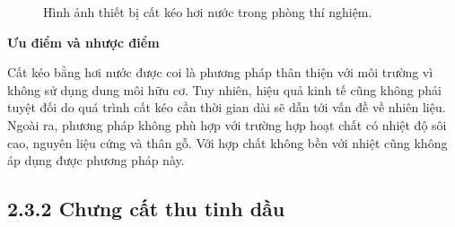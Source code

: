 \documentclass[
  twocolumn,
  landscape]{report}
\begin{document}
\begin{figure}


\caption{\label{fig-Catkeuhoinuoc}Hình ảnh thiết bị cất kéo hơi nước
trong phòng thí nghiệm.}

\end{figure}%

\textbf{Ưu điểm và nhược điểm}

Cất kéo bằng hơi nước được coi là phương pháp thân thiện với môi trường
vì không sử dụng dung môi hữu cơ. Tuy nhiên, hiệu quả kinh tế cũng không
phải tuyệt đối do quá trình cất kéo cần thời gian dài sẽ dẫn tới vấn đề
về nhiên liệu. Ngoài ra, phương pháp không phù hợp với trường hợp hoạt
chất có nhiệt độ sôi cao, nguyên liệu cứng và thân gỗ. Với hợp chất
không bền với nhiệt cũng không áp dụng được phương pháp này.

\subsection{2.3.2 Chưng cất thu tinh
dầu}\label{chux1b0ng-cux1ea5t-thu-tinh-dux1ea7u}
\end{document}
